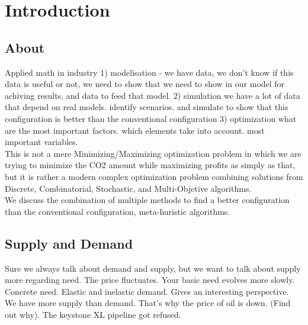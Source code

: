 \documentclass[12pt]{article}
\begin{document}
\maketitle
\tableofcontents
\newpage

\section{Introduction}

\subsection{About}
Applied math in industry
1) modelisation
  - we have data, we don't know if this data is useful or not, we need to show that we
need to show in our model for achiving results, and data to feed that model. 
2) simulation
we have a lot of data that depend on real models. identify scenarios. and simulate to 
show that this configuration is better than the conventional configuration 
3) optimization 
what are the most important factors. which elements take into account. most important
variables. \\

This is not a mere Minimizing/Maximizing optimization problem in which we are trying to minimize the CO2 amount while maximizing profits as simply as that, but it is rather
a modern complex optimization problem combining solutions from Discrete, Combinatorial,
Stochastic, and Multi-Objetive algorithms. \\

We discuss the combination of multiple methods to find a better configuration than
the conventional configuration, meta-huristic algorithms. 

\subsection{Supply and Demand}
Sure we always talk about demand and supply, but we want to talk about supply more regarding need. The price fluctuates. Your basic need evolves more slowly. Concrete need. Elastic and inelastic demand. Gives an interesting perspective. \\

We have more supply than demand. That's why the price of oil is down. (Find out why). The keystone XL pipeline got refused.\\
\end{document}
